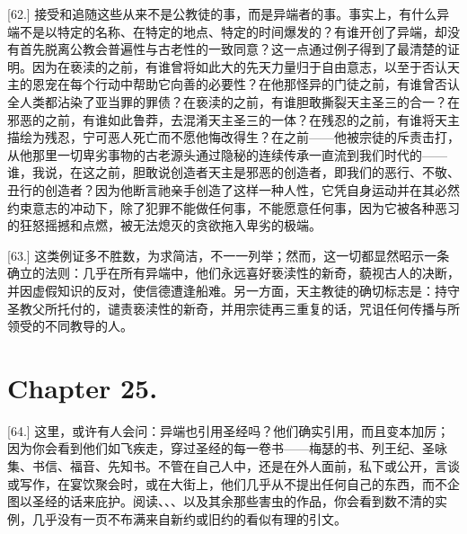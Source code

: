 [62.]  接受和追随这些从来不是公教徒的事，而是异端者的事。事实上，有什么异端不是以特定的名称、在特定的地点、特定的时间爆发的？有谁开创了异端，却没有首先脱离公教会普遍性与古老性的一致同意？这一点通过例子得到了最清楚的证明。因为在亵渎的之前，有谁曾将如此大的先天力量归于自由意志，以至于否认天主的恩宠在每个行动中帮助它向善的必要性？在他那怪异的门徒之前，有谁曾否认全人类都沾染了亚当罪的罪债？在亵渎的之前，有谁胆敢撕裂天主圣三的合一？在邪恶的之前，有谁如此鲁莽，去混淆天主圣三的一体？在残忍的之前，有谁将天主描绘为残忍，宁可恶人死亡而不愿他悔改得生？在之前——他被宗徒的斥责击打，从他那里一切卑劣事物的古老源头通过隐秘的连续传承一直流到我们时代的——谁，我说，在这之前，胆敢说创造者天主是邪恶的创造者，即我们的恶行、不敬、丑行的创造者？因为他断言祂亲手创造了这样一种人性，它凭自身运动并在其必然约束意志的冲动下，除了犯罪不能做任何事，不能愿意任何事，因为它被各种恶习的狂怒摇撼和点燃，被无法熄灭的贪欲拖入卑劣的极端。\par

[63.] 这类例证多不胜数，为求简洁，不一一列举；然而，这一切都显然昭示一条确立的法则：几乎在所有异端中，他们永远喜好亵渎性的新奇，藐视古人的决断，并因虚假知识的反对，使信德遭逢船难。另一方面，天主教徒的确切标志是：持守圣教父所托付的，谴责亵渎性的新奇，并用宗徒再三重复的话，咒诅任何传播与所领受的不同教导的人。\par


\section{Chapter 25.}

\par

[64.] 这里，或许有人会问：异端也引用圣经吗？他们确实引用，而且变本加厉；因为你会看到他们如飞疾走，穿过圣经的每一卷书——梅瑟的书、列王纪、圣咏集、书信、福音、先知书。不管在自己人中，还是在外人面前，私下或公开，言谈或写作，在宴饮聚会时，或在大街上，他们几乎从不提出任何自己的东西，而不企图以圣经的话来庇护。阅读、、、以及其余那些害虫的作品，你会看到数不清的实例，几乎没有一页不布满来自新约或旧约的看似有理的引文。\par

